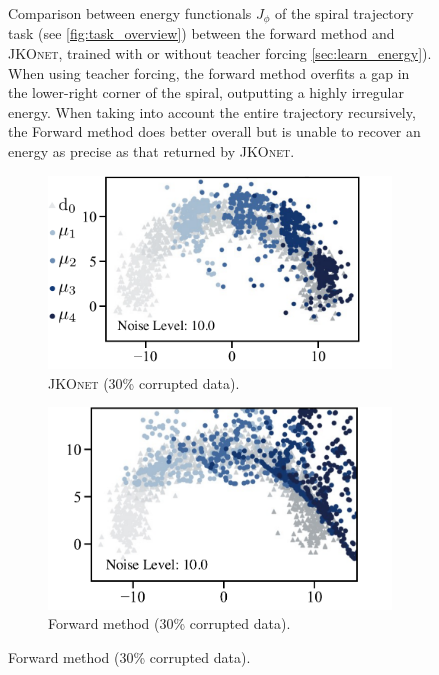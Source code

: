 \begin{figure}[t]
\begin{subfigure}[t]{0.24\textwidth}
     \end{subfigure}
	 \caption{Comparison between energy functionals $J_\phi$ of the spiral trajectory task (see \ref{fig:task_overview}) between the forward method and \textsc{JKOnet}, trained with or without teacher forcing \cref{sec:learn_energy}). When using teacher forcing, the forward method overfits a gap in the lower-right corner of the spiral, outputting a highly irregular energy. When taking into account the entire trajectory recursively, the Forward method does better overall but is unable to recover an energy as precise as that returned by \textsc{JKOnet}.}
	 \label{fig:exp_comp_spiral}
\end{figure}

\begin{figure}[t]
     \centering
     \begin{subfigure}[t]{0.485\textwidth}
         \centering
         \caption{\textsc{JKOnet} (30\% corrupted data).}
         \includegraphics[width=\textwidth]{figures/fig_predictions_jko_noise.pdf}
     \end{subfigure}
     \hfill
     \begin{subfigure}[t]{0.46\textwidth}
         \centering
         \caption{Forward method (30\% corrupted data).}
         \includegraphics[width=\textwidth]{figures/fig_predictions_forward_noise.pdf}
     \end{subfigure}
     

\end{figure}
